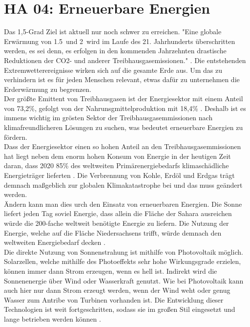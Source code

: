 \section{HA 04: Erneuerbare Energien} \label{ha04}
  Das 1,5-Grad Ziel ist aktuell nur noch schwer zu erreichen. "Eine globale Erwärmung von 1.5\textcelsius\ und 2\textcelsius\ wird im Laufe des 21. Jahrhunderts überschritten werden, es sei denn, es erfolgen in den kommenden Jahrzehnten drastische Reduktionen der CO2- und anderer Treibhausgasemissionen." \cite{ipcc_climate_2021}. Die entstehenden Extremwetterereignisse wirken sich auf die gesamte Erde aus. Um das zu verhindern ist es für jeden Menschen relevant, etwas dafür zu unternehmen die Erderwärmung zu begrenzen.\\
  Der größte Emittent von Treibhausgasen ist der Energiesektor mit einem Anteil von 73,2\%, gefolgt von der Nahrunsgmittelproduktion mit 18,4\% \cite{ritchie_co_2020}. Deshalb ist es immens wichtig im grösten Sektor der Treibhausgasemmissionen nach klimafreundlicheren Lösungen zu suchen, was bedeutet erneuerbare Energien zu fördern.\\
  Dass der Energiesektor einen so hohen Anteil an den Treibhausgasemmissionen hat liegt neben dem enorm hohen Konsum von Energie in der heutigen Zeit daran, dass 2020 85\% des weltweiten Primärenergiebedarfs klimaschädliche Energieträger lieferten \cite{quaschning_regenerative_2019}. Die Verbrennung von Kohle, Erdöl und Erdgas trägt demnach maßgeblich zur globalen Klimakatastrophe bei und das muss geändert werden.\\
  Ändern kann man dies urch den Einsatz von erneuerbaren Energien. Die Sonne liefert jeden Tag soviel Energie, dass allein die Fläche der Sahara ausreichen würde die 200-fache weltweit benötigte Energie zu liefern. Die Nutzung der Energie, welche auf die Fläche Niedersachsens trifft, würde demnach den weltweiten Energiebedarf decken \cite{quaschning_regenerative_2019}.\\
  Die direkte Nutzung von Sonnenstrahung ist mithilfe von Photovoltaik möglich. Solarzellen, welche mithilfe des Photoeffekts sehr hohe Wirkungsgrade erzielen, können immer dann Strom erzeugen, wenn es hell ist. Indirekt wird die Sonnenenergie über Wind oder Wasserkraft genutzt. Wie bei Photovoltaik kann auch hier nur dann Strom erzeugt werden, wenn der Wind weht oder genug Wasser zum Antribe von Turbinen vorhanden ist. Die Entwicklung dieser Technologien ist weit fortgeschritten, sodass sie im großen Stil eingesetzt und lange betrieben werden können \cite{quaschning_regenerative_2019}.\\
